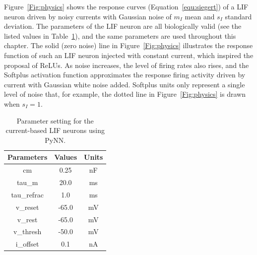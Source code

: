 	Figure~\ref{Fig:physics} shows the response curves (Equation~\ref{equ:siegert}) of a LIF neuron driven by noisy currents with Gaussian noise of $m_I$ mean and $s_I$ standard deviation.
	The parameters of the LIF neuron are all biologically valid (see the listed values in Table~\ref{tbl:pynnConfig}), and the same parameters are used throughout this chapter.
	The solid (zero noise) line in Figure~\ref{Fig:physics} illustrates the response function of such an LIF neuron injected with constant current, which inspired the proposal of ReLUs.
	As noise increases, the level of firing rates also rises, and the Softplus activation function approximates the response firing activity driven by current with Gaussian white noise added.
	Softplus units only represent a single level of noise that, for example, the dotted line in Figure~\ref{Fig:physics} is drawn when $s_I=1$.
	
		\begin{table}[bt]
			\centering
			\caption{\label{tbl:pynnConfig}Parameter setting for the current-based LIF neurons using PyNN.}
			\bgroup
			\def\arraystretch{1.4}
			\begin{tabular}{c c c}
				Parameters & Values & Units \\
				\hline
				cm & 0.25 & nF	\\
				tau\_m & 20.0 & ms\\
				tau\_refrac & 1.0 & ms\\
				v\_reset & -65.0 & mV\\
				v\_rest & -65.0 & mV\\
				v\_thresh & -50.0 & mV\\
				i\_offset & 0.1 & nA\\
				\hline
			\end{tabular}
			\egroup
		\end{table}
	

